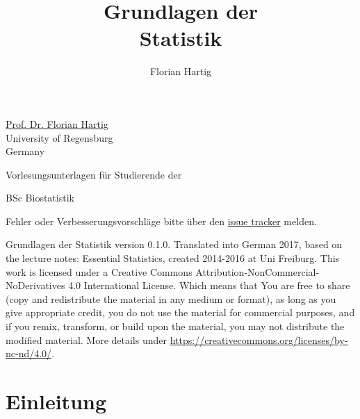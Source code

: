 \documentclass[a4paper,twoside]{tufte-book}\usepackage[]{graphicx}\usepackage[]{color}
\title{Grundlagen der\\Statistik}
\author{Florian Hartig}
\begin{document}

\let\cleardoublepage\clearpage %
\maketitle


\thispagestyle{empty}
\null


\href{http://www.uni-regensburg.de/biologie-vorklinische-medizin/theoretische-oekologie/mitarbeiter/hartig/index.html}{Prof. Dr. Florian Hartig}\\
University of Regensburg\\
Germany\\[0.5cm]

\begin{fullwidth}
Vorlesungsunterlagen für Studierende der

\begin{itemize*}
  \item BSc Biostatistik
\end{itemize*}

\vspace{0.5cm}

Fehler oder Verbesserungsvorschläge bitte über den \href{https://github.com/florianhartig/Statistics/issues}{issue tracker} melden. 

\end{fullwidth}


\vfill
\begin{fullwidth}
Grundlagen der Statistik version 0.1.0. Translated into German 2017, based on the lecture notes: Essential Statistics, created 2014-2016 at Uni Freiburg. This work is licensed under a Creative Commons Attribution-NonCommercial-NoDerivatives 4.0 International License. Which means that You are free to share (copy and redistribute the material in any medium or format), as long as you give appropriate credit, you do not use the material for commercial purposes, and if you remix, transform, or build upon the material, you may not distribute the modified material. More details under \href{https://creativecommons.org/licenses/by-nc-nd/4.0/}{https://creativecommons.org/licenses/by-nc-nd/4.0/}.
\end{fullwidth}


\newpage
\tableofcontents

\chapter{Einleitung} %
\end{document}
